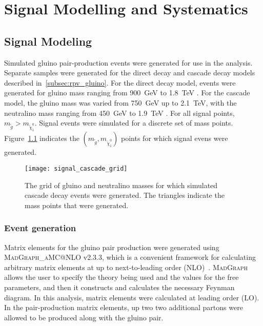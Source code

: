 \chapter{Signal Modelling and Systematics} \label{ch:signal}

\section{Signal Modeling}\label{sec:signal_modeling}

Simulated gluino pair-production events were generated for use in the analysis.
Separate samples were generated for the direct decay and cascade decay models described in~\ref{subsec:rpv_gluino}.
For the direct decay model, events were generated for gluino mass ranging from 900~GeV to 1.8~TeV .
For the cascade model, the gluino mass was varied from 750~GeV up to 2.1~TeV, with the neutralino mass ranging from
450~GeV to 1.9~TeV .
For all signal points, $m_{\tilde{g}} > m_{\tilde{\chi}_1^0}$.
Signal events were simulated for a discrete set of mass points.
Figure~\ref{fig:signal_cascade_grid} indicates the $\left(m_{\tilde{g}}, m_{\tilde{\chi}_1^0}\right)$ points for which
signal evens were generated.

\begin{figure}[!ht]
    \centering
\texttt{[image: signal\_cascade\_grid]}
\caption{The grid of gluino and neutralino masses for which simulated cascade decay events were generated. The triangles
indicate the mass points that were generated.}
\label{fig:signal_cascade_grid}
\end{figure}

\subsection{Event generation}\label{subsec:signal_event_gen}

Matrix elements for the gluino pair production were generated using \textsc{MadGraph\_aMC@NLO} v2.3.3,
which is a convenient framework for calculating arbitrary matrix elements at up to next-to-leading order
(NLO)~\cite{signal-madgraph}.
\textsc{MadGraph} allows the user to specify the theory being used and the values for the free parameters,
and then it constructs and calculates the necessary Feynman diagram.
In this analysis, matrix elements were calculated at leading order (LO).
In the pair-production matrix elements, up two two additional partons were allowed to be produced along with the
gluino pair.

